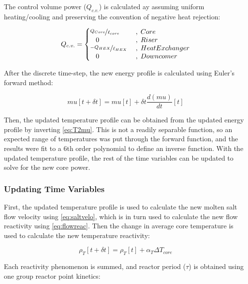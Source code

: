 The control volume power  ($Q_{c.v.}$) is calculated ay assuming uniform heating/cooling and preserving the convention of negative heat rejection:

\begin{equation}
    Q_{c.v.} = \left\{ 
        \begin{matrix*}[l]
            \nicefrac{Q_{Core}}{\ell_{core}} &\;,\; Core\\
            \;\;\;0                       &\;,\; Riser\\
            \nicefrac{-Q_{HEX}}{\ell_{HEX}}  &\;,\; Heat Exchanger\\
            \;\;\;0                       &\;,\; Downcomer
        \end{matrix*}
    \right.
\end{equation}

After the discrete time-step, the new energy profile is calculated using Euler's forward method:

\begin{equation}
    mu[t+\delta t] = mu[t] + \delta t\frac{d(mu)}{dt}[t]
\end{equation}

Then, the updated temperature profile can be obtained from the updated energy profile by inverting \ref{eq:T2mu}. This is not a readily separable function, so an expected range of temperatures was put through the forward function, and the results were fit to a 6th order polynomial to define an inverse function. With the updated temperature profile, the rest of the time variables can be updated to solve for the new core power.

\subsubsection{Updating Time Variables}
First, the updated temperature profile is used to calculate the new molten salt flow velocity using \ref{eq:saltvelo}, which is in turn used to calculate the new flow reactivity using \ref{eq:flowreac}. Then the change in average core temperature is used to calculate the new temperature reactivity:

\begin{equation}
    \rho_T[t+\delta t] = \rho_T[t] + \alpha_T\Delta T_{core}
\end{equation}

Each reactivity phenomenon is summed, and reactor period ($\tau$) is obtained using one group reactor point kinetics:


